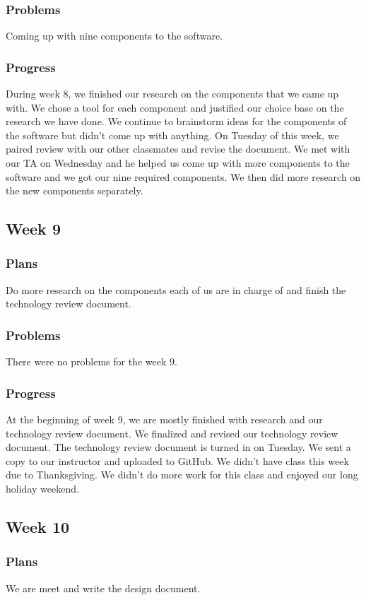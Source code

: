 \documentclass[onecolumn, draftclsnofoot, 10pt, compsoc]{IEEEtran}
\begin{document}
\subsubsection{Problems}
Coming up with nine components to the software.
\subsubsection{Progress}
During week 8, we finished our research on the components that we came up with. We chose a tool for each component and justified our choice base on the research we have done. We continue to brainstorm ideas for the components of the software but didn't come up with anything. On Tuesday of this week, we paired review with our other classmates and revise the document. We met with our TA on Wednesday and he helped us come up with more components to the software and we got our nine required components. We then did more research on the new components separately.

\subsection{Week 9}
\subsubsection{Plans}
Do more research on the components each of us are in charge of and finish the technology review document.
\subsubsection{Problems}
There were no problems for the week 9.
\subsubsection{Progress}
At the beginning of week 9, we are mostly finished with research and our technology review document. We finalized and revised our technology review document. The technology review document is turned in on Tuesday. We sent a copy to our instructor and uploaded to GitHub. We didn't have class this week due to Thanksgiving. We didn't do more work for this class and enjoyed our long holiday weekend. 

\subsection{Week 10}
\subsubsection{Plans}
We are meet and write the design document.
\end{document}
